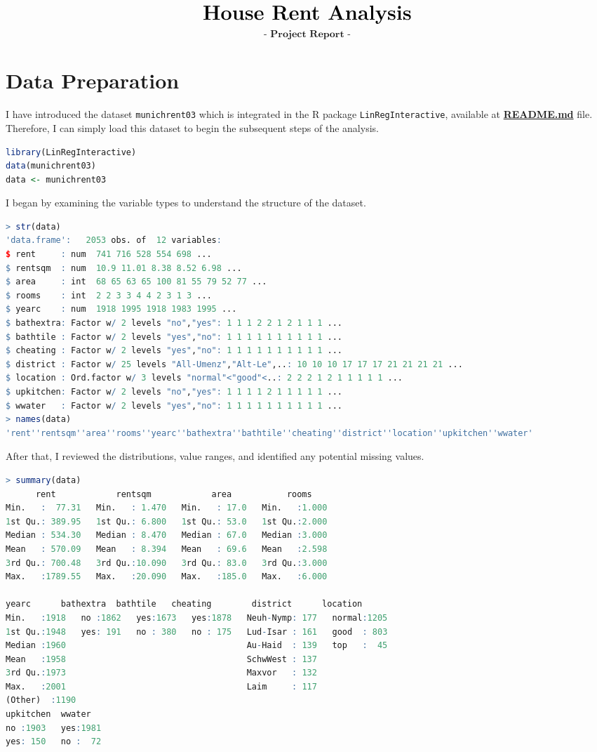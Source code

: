 \documentclass[15pt,a4paper]{report}
\begin{document}
\[
	\huge \textbf{House Rent Analysis}
\]
\[
\textbf{- Project Report -}
\]
\section*{Data Preparation}
I have introduced the dataset \lstinline[language=R]|munichrent03| which is integrated in the R package \lstinline[language=R]|LinRegInteractive|, available at \textbf{\href{https://github.com/taitran0102/rent-analysis/blob/main/README.md}{README.md}} file. Therefore, I can simply load this dataset to begin the subsequent steps of the analysis.
\begin{lstlisting}[language=R]
library(LinRegInteractive)
data(munichrent03)
data <- munichrent03 
\end{lstlisting}
I began by examining the variable types to understand the structure of the dataset. 
\begin{lstlisting}[language=R]
> str(data)
'data.frame':	2053 obs. of  12 variables:
$ rent     : num  741 716 528 554 698 ...
$ rentsqm  : num  10.9 11.01 8.38 8.52 6.98 ...
$ area     : int  68 65 63 65 100 81 55 79 52 77 ...
$ rooms    : int  2 2 3 3 4 4 2 3 1 3 ...
$ yearc    : num  1918 1995 1918 1983 1995 ...
$ bathextra: Factor w/ 2 levels "no","yes": 1 1 1 2 2 1 2 1 1 1 ...
$ bathtile : Factor w/ 2 levels "yes","no": 1 1 1 1 1 1 1 1 1 1 ...
$ cheating : Factor w/ 2 levels "yes","no": 1 1 1 1 1 1 1 1 1 1 ...
$ district : Factor w/ 25 levels "All-Umenz","Alt-Le",..: 10 10 10 17 17 17 21 21 21 21 ...
$ location : Ord.factor w/ 3 levels "normal"<"good"<..: 2 2 2 1 2 1 1 1 1 1 ...
$ upkitchen: Factor w/ 2 levels "no","yes": 1 1 1 1 2 1 1 1 1 1 ...
$ wwater   : Factor w/ 2 levels "yes","no": 1 1 1 1 1 1 1 1 1 1 ...
> names(data)
'rent''rentsqm''area''rooms''yearc''bathextra''bathtile''cheating''district''location''upkitchen''wwater'
\end{lstlisting}
After that, I reviewed the distributions, value ranges, and identified any potential missing values.
\begin{lstlisting}[language=R]
> summary(data)
      rent            rentsqm            area           rooms      
Min.   :  77.31   Min.   : 1.470   Min.   : 17.0   Min.   :1.000  
1st Qu.: 389.95   1st Qu.: 6.800   1st Qu.: 53.0   1st Qu.:2.000  
Median : 534.30   Median : 8.470   Median : 67.0   Median :3.000  
Mean   : 570.09   Mean   : 8.394   Mean   : 69.6   Mean   :2.598  
3rd Qu.: 700.48   3rd Qu.:10.090   3rd Qu.: 83.0   3rd Qu.:3.000  
Max.   :1789.55   Max.   :20.090   Max.   :185.0   Max.   :6.000  

yearc      bathextra  bathtile   cheating        district      location   
Min.   :1918   no :1862   yes:1673   yes:1878   Neuh-Nymp: 177   normal:1205  
1st Qu.:1948   yes: 191   no : 380   no : 175   Lud-Isar : 161   good  : 803  
Median :1960                                    Au-Haid  : 139   top   :  45  
Mean   :1958                                    SchwWest : 137                
3rd Qu.:1973                                    Maxvor   : 132                
Max.   :2001                                    Laim     : 117                
(Other)  :1190                
upkitchen  wwater    
no :1903   yes:1981  
yes: 150   no :  72  

\end{lstlisting}
\end{document}
